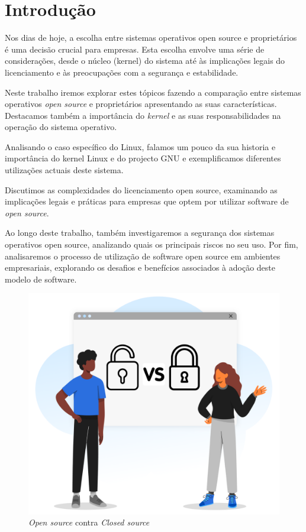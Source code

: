 \section{Introdução} \label{section: Introducao}
Nos dias de hoje, a escolha entre sistemas operativos open source e proprietários é uma decisão crucial para empresas. Esta escolha envolve uma série de considerações, desde o núcleo (kernel) do sistema até às implicações legais do licenciamento e às preocupações com a segurança e estabilidade.
\par \vspace{6pt}
Neste trabalho iremos explorar estes tópicos fazendo a comparação entre sistemas operativos \textit{open source} e proprietários apresentando as suas características.
Destacamos também a importância do \textit{kernel} e as suas responsabilidades na operação do sistema operativo.
\par \vspace{6pt}
Analisando o caso específico do Linux, falamos um pouco da sua historia e importância do kernel Linux e do projecto GNU e exemplificamos diferentes utilizações actuais deste sistema.
\par \vspace{6pt}
Discutimos as complexidades do licenciamento open source, examinando as implicações legais e práticas para empresas que optem por utilizar software de \textit{open source}.
\par \vspace{6pt}
Ao longo deste trabalho, também investigaremos a segurança dos sistemas operativos open source, analizando quais os principais riscos no seu uso. Por fim, analisaremos o processo de utilização de software open source em ambientes empresariais, explorando os desafios e benefícios associados à adoção deste modelo de software.
\vspace{12pt}
\begin{figure}[H]
  \centering
  \includegraphics[scale=0.32]{Figures/0. General/open_vs_closed.png}
  \caption{\textit{Open source} contra \textit{Closed source}}
  \label{Open source vs. closed source}
\end{figure}
